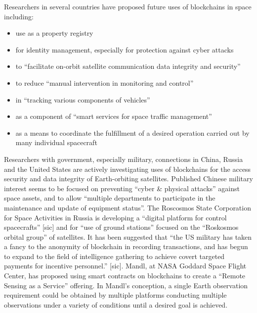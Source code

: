 \documentclass[]{aiaa-tc}%
\begin{document}
Researchers in several countries have proposed future uses of blockchains in space including:
\begin{itemize}
\item use as a property registry\cite{beldavs_blockchains_2016}
\item for identity management, especially for protection against cyber attacks \cite{yu_blockchain_2019,xu_exploration_2019}
\item to  ``facilitate on-orbit satellite communication data integrity and security''\cite{molesky_blockchain_2018}
\item to reduce ``manual intervention in monitoring and control''\cite{jennath_distributed_2019}
\item in ``tracking various components of vehicles''\cite{jennath_distributed_2019}
\item as a component of ``smart services for space traffic management''\cite{skobelev_towards_2018}
\item as a means to coordinate the fulfillment of a desired operation carried out by many individual spacecraft\cite{mandl_bitcoin_2017}
\end{itemize}

Researchers with government, especially military, connections in China, Russia and the United States are actively investigating uses of blockchains for the access security and data integrity of Earth-orbiting satellites. Published Chinese military interest seems to be focused on preventing ``cyber \& physical attacks'' against space assets\cite{yu_blockchain_2019}, and to allow ``multiple departments to participate in the maintenance and update of equipment status''\cite{yu_situational_2019}. The Roscosmos State Corporation for Space Activities in Russia is developing a ``digital platform for control spacecrafts'' [sic] and for ``use of ground stations'' focused on the ``Roskosmos orbital group'' of satellites\cite{skobelev_towards_2018}. It has been suggested that ``the US military has taken a fancy to the anonymity of blockchain in recording transactions, and has begun to expand to the field of intelligence gathering to achieve covert targeted payments for incentive personnel.'' [sic]\cite{yu_situational_2019}. Mandl, at NASA Goddard Space Flight Center, has proposed using smart contracts on blockchains to create a ``Remote Sensing as a Service'' offering\cite{mandl_bitcoin_2017}. In Mandl's conception, a single Earth observation requirement could be obtained by multiple platforms conducting multiple observations under a variety of conditions until a desired goal is achieved.
\end{document}
